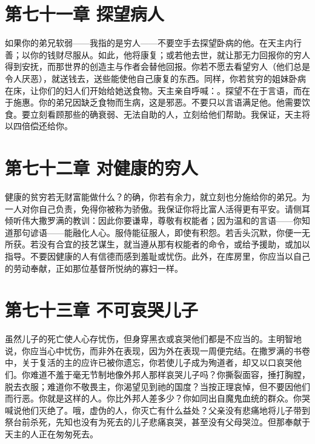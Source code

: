 
\section{第七十一章  探望病人}

如果你的弟兄软弱——我指的是穷人——不要空手去探望卧病的他。在天主内行善；以你的钱财尽服从。如此，他将康复；或若他去世，就让那无力回报你的穷人得到安抚，而那世界的创造主与作者会替他回报。你若不愿去看望穷人（他们总是令人厌恶），就送钱去，送些能使他自己康复的东西。同样，你若贫穷的姐妹卧病在床，让你们的妇人们开始给她送食物。天主亲自呼喊：。探望不在于言语，而在于施惠。你的弟兄因缺乏食物而生病，这是邪恶。不要只以言语满足他。他需要饮食。要立刻看顾那些的确衰弱、无法自助的人，立刻给他们帮助。我保证，天主将以四倍偿还给你。\par


\section{第七十二章 对健康的穷人}

健康的贫穷若无财富能做什么？的确，你若有余力，就立刻也分施给你的弟兄。为一人对你自己负责，免得你被称为骄傲。我保证你将比富人活得更有平安。请侧耳倾听伟大撒罗满的教训：因此你要谦卑，尊敬有权能者；因为温和的言语——你知道那句谚语——能融化人心。服侍能征服人，即使有积怨。若舌头沉默，你便一无所获。若没有合宜的技艺谋生，就当遵从那有权能者的命令，或给予援助，或加以指导。不要因健康的人有信德而感到羞耻或忧伤。此外，在库房里，你应当以自己的劳动奉献，正如那位基督所悦纳的寡妇一样。\par


\section{第七十三章 不可哀哭儿子}

虽然儿子的死亡使人心存忧伤，但身穿黑衣或哀哭他们都是不应当的。主明智地说，你应当心中忧伤，而非外在表现，因为外在表现一周便完结。在撒罗满的书卷中，关于复活的主的应许已被你遗忘，你若使儿子成为殉道者，却又以口哀哭他们。你难道不羞于毫无节制地像外邦人那样哀哭儿子吗？你撕裂面容，捶打胸膛，脱去衣服；难道你不敬畏主，你渴望见到祂的国度？当按正理哀悼，但不要因他们而行恶。你就是这样的人。你比外邦人差多少？你如同出自魔鬼血统的群众。你哭喊说他们灭绝了。哦，虚伪的人，你灭亡有什么益处？父亲没有悲痛地将儿子带到祭台前杀死，先知也没有为死去的儿子悲痛哀哭，甚至没有父母哭泣。但那奉献于天主的人正在匆匆死去。\par

